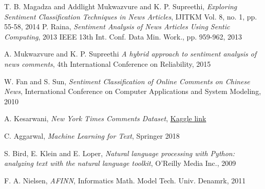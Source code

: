 \begin{thebibliography}{15}

T. B. Magadza and Addlight Mukwazvure and K. P. Supreethi,
  \textit{Exploring Sentiment Classification Techniques in News Articles}, IJITKM Vol. 8, no. 1, pp. 55-58, 2014
P. Raina, \textit{Sentiment Analysis of News Articles Using Sentic Computing}, 2013 IEEE 13th Int. Conf. Data Min. Work., pp. 959-962, 2013

A. Mukwazvure and K. P. Supreethi \textit{A hybrid approach to sentiment analysis of news comments}, 4th International Conference on Reliability, 2015

W. Fan and S. Sun, \textit{Sentiment Classification of Online Comments on Chinese News}, International Conference on Computer Applications and System Modeling, 2010

A. Kesarwani, \textit{New York Times Comments Dataset}, \href{https://www.kaggle.com/aashita/nyt-comments}{Kaggle link}

C. Aggarwal, \textit{Machine Learning for Text}, Springer 2018

S. Bird, E. Klein and E. Loper, \textit{Natural language processing with Python: analyzing text with the natural language toolkit}, O'Reilly Media Inc., 2009

F. A. Nielsen, \textit{AFINN}, Informatics Math. Model Tech. Univ. Denamrk, 2011


\end{thebibliography}